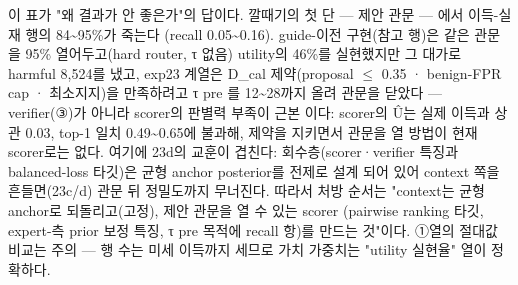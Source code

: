 이 표가 "왜 결과가 안 좋은가"의 답이다. 깔때기의 첫 단 — 제안 관문 — 에서 이득-실재 행의 84\textasciitilde{}95\%가 죽는다 (recall 0.05\textasciitilde{}0.16). guide-이전 구현(참고 행)은 같은 관문을 95\% 열어두고(hard router, τ 없음) utility의 46\%를 실현했지만 그 대가로 harmful 8,524를 냈고, exp23 계열은 D\_\allowbreak{}cal 제약(proposal \ensuremath{\leq} 0.35 · benign-FPR cap · 최소지지)을 만족하려고 τ pre 를 12\textasciitilde{}28까지 올려 관문을 닫았다 — verifier(③)가 아니라 scorer의 판별력 부족이 근본 이다: scorer의 Û는 실제 이득과 상관 0.03, top-1 일치 0.49\textasciitilde{}0.65에 불과해, 제약을 지키면서 관문을 열 방법이 현재 scorer로는 없다. 여기에 23d의 교훈이 겹친다: 회수층(scorer·verifier 특징과 balanced-loss 타깃)은 균형 anchor posterior를 전제로 설계 되어 있어 context 쪽을 흔들면(23c/\allowbreak{}d) 관문 뒤 정밀도까지 무너진다. 따라서 처방 순서는 "context는 균형 anchor로 되돌리고(고정), 제안 관문을 열 수 있는 scorer (pairwise ranking 타깃, expert-측 prior 보정 특징, τ pre 목적에 recall 항)를 만드는 것"이다. ①열의 절대값 비교는 주의 — 행 수는 미세 이득까지 세므로 가치 가중치는 "utility 실현율" 열이 정확하다.

